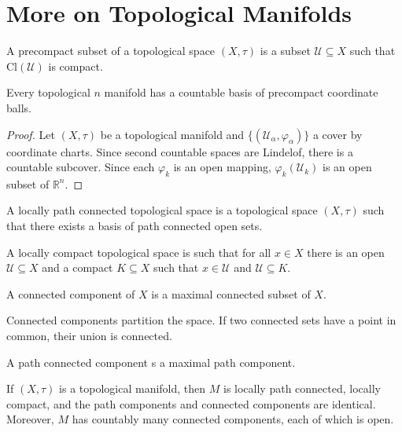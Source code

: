 \documentclass{article}                                                        %
\begin{document}
    \section{More on Topological Manifolds}
        \begin{definition}
            A precompact subset of a topological space $(X,\tau)$ is a subset
            $\mathcal{U}\subseteq{X}$ such that $\textrm{Cl}(\mathcal{U})$
            is compact.
        \end{definition}
        \begin{theorem}
            Every topological $n$ manifold has a countable basis of precompact
            coordinate balls.
        \end{theorem}
        \begin{proof}
            Let $(X,\tau)$ be a topological manifold and
            $\{(\mathcal{U}_{\alpha},\varphi_{\alpha})\}$ a cover by coordinate
            charts. Since second countable spaces are Lindelof, there is a
            countable subcover. Since each $\varphi_{k}$ is an open mapping,
            $\varphi_{k}(\mathcal{U}_{k})$ is an open subset of
            $\mathbb{R}^{n}$.
        \end{proof}
        \begin{definition}
            A locally path connected topological space is a topological space
            $(X,\tau)$ such that there exists a basis of path connected open
            sets.
        \end{definition}
        \begin{definition}
            A locally compact topological space is such that for all $x\in{X}$
            there is an open $\mathcal{U}\subseteq{X}$ and a compact
            $K\subseteq{X}$ such that $x\in\mathcal{U}$ and
            $\mathcal{U}\subseteq{K}$.
        \end{definition}
        \begin{definition}
            A connected component of $X$ is a maximal connected subset of $X$.
        \end{definition}
        Connected components partition the space. If two connected sets have
        a point in common, their union is connected.
        \begin{definition}
            A path connected component s a maximal path component.
        \end{definition}
        \begin{theorem}
            If $(X,\tau)$ is a topological manifold, then $M$ is locally path
            connected, locally compact, and the path components and connected
            components are identical. Moreover, $M$ has countably many connected
            components, each of which is open.
        \end{theorem}
\end{document}
